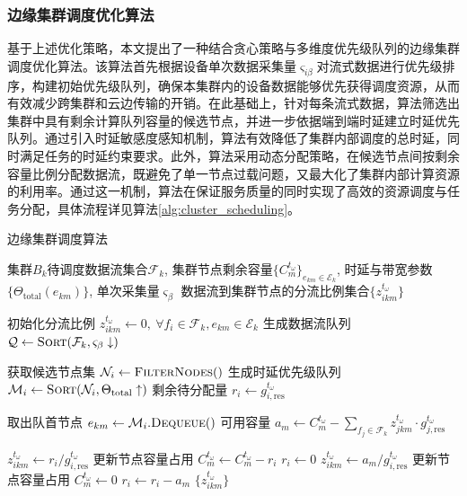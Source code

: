 \subsubsection{边缘集群调度优化算法}

基于上述优化策略，本文提出了一种结合贪心策略与多维度优先级队列的边缘集群调度优化算法。该算法首先根据设备单次数据采集量$\varsigma_{i\beta}$对流式数据进行优先级排序，构建初始优先级队列，确保本集群内的设备数据能够优先获得调度资源，从而有效减少跨集群和云边传输的开销。在此基础上，针对每条流式数据，算法筛选出集群中具有剩余计算队列容量的候选节点，并进一步依据端到端时延建立时延优先队列。通过引入时延敏感度感知机制，算法有效降低了集群内部调度的总时延，同时满足任务的时延约束要求。此外，算法采用动态分配策略，在候选节点间按剩余容量比例分配数据流，既避免了单一节点过载问题，又最大化了集群内部计算资源的利用率。通过这一机制，算法在保证服务质量的同时实现了高效的资源调度与任务分配，具体流程详见算法\ref{alg:cluster_scheduling}。

\begin{algorithm}[ht]
\caption{边缘集群调度算法}
\label{alg:cluster_scheduling}
\begin{algorithmic}[1]
\REQUIRE  
  集群$B_k$待调度数据流集合$\mathcal{F}_k$, 集群节点剩余容量$\{C^{t_\omega}_m\}_{e_{km} \in \mathcal{E}_k}$, 时延与带宽参数$\{\Theta_{\text{total}}(e_{km})\}$, 单次采集量$\varsigma_\beta$
\ENSURE  
  数据流到集群节点的分流比例集合$\{z_{ikm}^{t_\omega}\}$

\STATE 初始化分流比例 $z_{ikm}^{t_\omega} \leftarrow 0,\ \forall f_i \in \mathcal{F}_k, e_{km} \in \mathcal{E}_k$  
\STATE 生成数据流队列 $\mathcal{Q} \leftarrow \textsc{Sort}(\mathcal{F}_k, \varsigma_\beta \downarrow)$  

  \STATE 获取候选节点集 $\mathcal{N}_i \leftarrow \textsc{FilterNodes}()$  
  \STATE 生成时延优先级队列 $\mathcal{M}_i \leftarrow \textsc{Sort}(\mathcal{N}_i, \Theta_{\text{total}} \uparrow)$  
  \STATE 剩余待分配量 $r_i \leftarrow g_{i,\text{res}}^{t_\omega}$

    \STATE 取出队首节点 $e_{km} \leftarrow \mathcal{M}_i.\textsc{Dequeue}()$
    \STATE 可用容量 $a_m \leftarrow C^{t_\omega}_m - \sum_{f_j \in \mathcal{F}_k} z_{jkm}^{t_\omega} \cdot g_{j,\text{res}}^{t_\omega}$
    
      \STATE $z_{ikm}^{t_\omega} \leftarrow r_i / g_{i,\text{res}}^{t_\omega}$  
      \STATE 更新节点容量占用 $C^{t_\omega}_m \leftarrow C^{t_\omega}_m - r_i$
      \STATE $r_i \leftarrow 0$
    \ELSE
      \STATE $z_{ikm}^{t_\omega} \leftarrow a_m / g_{i,\text{res}}^{t_\omega}$  
      \STATE 更新节点容量占用 $C^{t_\omega}_m \leftarrow 0$
      \STATE $r_i \leftarrow r_i - a_m$
    \ENDIF
  \ENDWHILE
\ENDFOR
\RETURN $\{z_{ikm}^{t_\omega}\}$
\end{algorithmic}
\end{algorithm}

